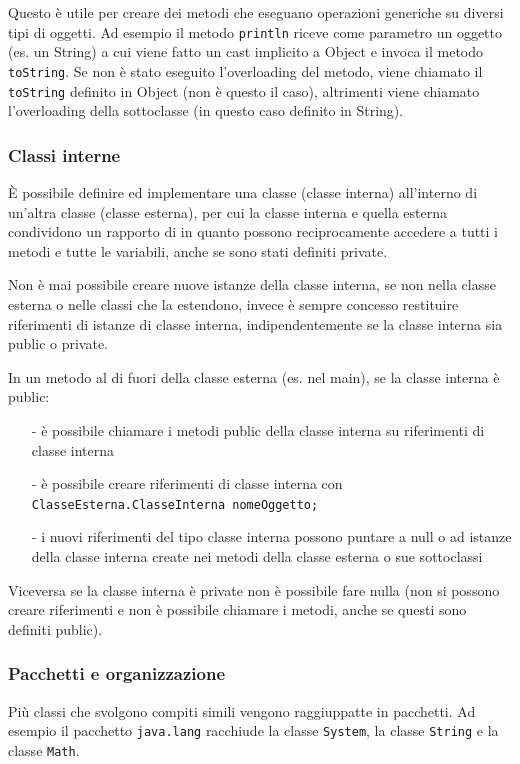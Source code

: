\documentclass[a4paper]{article}
\begin{document}
Questo è utile per creare dei metodi che eseguano operazioni generiche su diversi tipi di oggetti. Ad esempio il metodo \verb|println| riceve
come parametro un oggetto (es. un String) a cui viene fatto un cast implicito a Object e invoca il metodo \verb|toString|. Se non è stato eseguito
l'overloading del metodo, viene chiamato il \verb|toString| definito in Object (non è questo il caso), altrimenti viene chiamato l'overloading della
sottoclasse (in questo caso definito in String).

\subsubsection*{Classi interne}
È possibile definire ed implementare una classe (classe interna) all'interno di un'altra classe (classe esterna), per cui la classe interna e
quella esterna condividono un rapporto di  in quanto possono reciprocamente accedere a tutti i metodi e tutte le variabili, anche
se sono stati definiti private.

Non è mai possibile creare nuove istanze della classe interna, se non nella classe esterna o nelle classi che la estendono, invece è sempre
concesso restituire riferimenti di istanze di classe interna, indipendentemente se la classe interna sia public o private.

In un metodo al di fuori della classe esterna (es. nel main), se la classe interna è public:
\begin{itemize} [topsep=3pt, itemsep=0pt]
	\item[-] è possibile chiamare i metodi public della classe interna su riferimenti di classe interna
	\item[-] è possibile creare riferimenti di classe interna con \verb|ClasseEsterna.ClasseInterna nomeOggetto;|
	\item[-] i nuovi riferimenti del tipo classe interna possono puntare a null o ad istanze della classe interna create nei metodi della classe
	esterna o sue sottoclassi
\end{itemize}

Viceversa se la classe interna è private non è possibile fare nulla (non si possono creare riferimenti e non è possibile chiamare i metodi, anche
se questi sono definiti public).

\subsubsection*{Pacchetti e organizzazione}
Più classi che svolgono compiti simili vengono raggiuppatte in pacchetti. Ad esempio il pacchetto \verb|java.lang| racchiude la classe
\verb|System|, la classe \verb|String| e la classe \verb|Math|.
\end{document}
